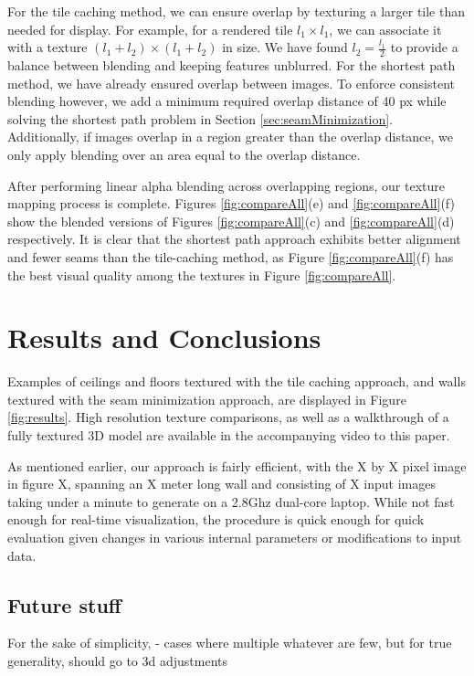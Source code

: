 \documentclass[]{spie}  %
\begin{document}
For the tile caching method, we can ensure overlap by texturing a
larger tile than needed for display. For example, for a rendered tile
$l_1 \times l_1$, we can associate it with a texture $(l_1 + l_2)
\times (l_1 + l_2)$ in size.  We have found $l_2 = \frac{l_1}{2}$ to
provide a balance between blending and keeping features unblurred. For
the shortest path method, we have already ensured overlap between
images. To enforce consistent blending however, we add a minimum
required overlap distance of 40 px while solving the shortest path
problem in Section \ref{sec:seamMinimization}. Additionally, if images
overlap in a region greater than the overlap distance, we only apply
blending over an area equal to the overlap distance.

After performing linear alpha blending across overlapping regions, our
texture mapping process is complete. Figures \ref{fig:compareAll}(e)
and \ref{fig:compareAll}(f) show the blended versions of Figures
\ref{fig:compareAll}(c) and \ref{fig:compareAll}(d) respectively. It
is clear that the shortest path approach exhibits better alignment
and fewer seams than the tile-caching method, as Figure
\ref{fig:compareAll}(f) has the best visual quality among the textures
in Figure \ref{fig:compareAll}.

\section{Results and Conclusions}
\label{sec:resultsAndConclusions}
Examples of ceilings and floors textured with the tile caching
approach, and walls textured with the seam minimization approach, are
displayed in Figure \ref{fig:results}. High resolution texture
comparisons, as well as a walkthrough of a fully textured 3D model are
available in the accompanying video to this paper.

As mentioned earlier, our approach is fairly efficient, with the X by
X pixel image in figure X, spanning an X meter long wall and
consisting of X input images taking under a minute to generate on a
2.8Ghz dual-core laptop. While not fast enough for real-time
visualization, the procedure is quick enough for quick evaluation given
changes in various internal parameters or modifications to input data.

\subsection{Future stuff}
For the sake of simplicity, - cases where multiple whatever
are few, but for true generality, should go to 3d adjustments


\end{document}
